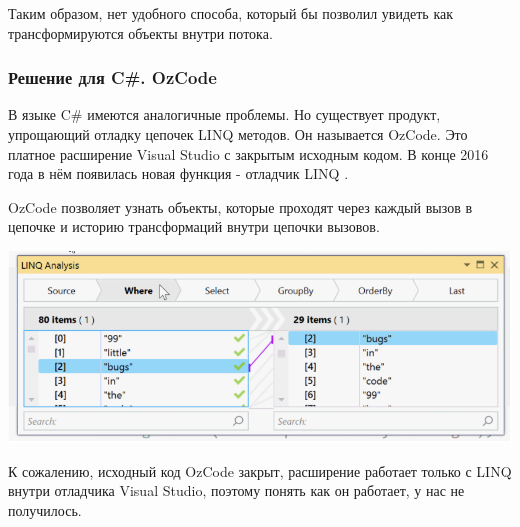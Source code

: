 Таким образом, нет удобного способа, который бы позволил увидеть как трансформируются объекты внутри потока.

\subsubsection{Решение для C\#. OzCode}
В языке C\# имеются аналогичные проблемы. Но существует продукт, упрощающий отладку цепочек LINQ методов. Он называется OzCode. Это платное расширение Visual Studio \cite{ms:vs} с закрытым исходным кодом. В конце 2016 года в нём появилась новая функция - отладчик LINQ \cite{ms:ozcode}.

OzCode позволяет узнать объекты, которые проходят через каждый вызов в цепочке и историю трансформаций внутри цепочки вызовов.

\includegraphics[scale=0.6]{chapter1/img/linq.png}

К сожалению, исходный код OzCode закрыт, расширение работает только с LINQ внутри отладчика Visual Studio, поэтому понять как он работает, у нас не получилось. 
